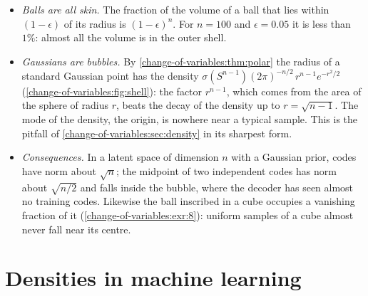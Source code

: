 \begin{notechapter}
\begin{mlthread}
\begin{itemize}[nosep]
  \item \emph{Balls are all skin.} The fraction of the volume of a ball
        that lies within $(1 - \epsilon)$ of its radius is
        $(1 - \epsilon)^n$. For $n = 100$ and $\epsilon = 0.05$ it is
        less than $1\%$: almost all the volume is in the outer shell.
  \item \emph{Gaussians are bubbles.} By
        \cref{change-of-variables:thm:polar} the radius of a standard
        Gaussian point has the density
        $\sigma(S^{n-1})(2\pi)^{-n/2}\,r^{n-1}e^{-r^2/2}$
        (\cref{change-of-variables:fig:shell}): the factor $r^{n-1}$,
        which comes from the area of the sphere of radius $r$, beats
        the decay of the density up to $r = \sqrt{n - 1}$. The mode of
        the density, the origin, is nowhere near a typical sample. This
        is the pitfall of \cref{change-of-variables:sec:density} in its
        sharpest form.
  \item \emph{Consequences.} In a latent space of dimension $n$ with a
        Gaussian prior, codes have norm about $\sqrt n$; the midpoint
        of two independent codes has norm about $\sqrt{n/2}$ and falls
        inside the bubble, where the decoder has seen almost no
        training codes. Likewise the ball inscribed in a cube occupies
        a vanishing fraction of it
        (\cref{change-of-variables:exr:8}): uniform samples of a cube
        almost never fall near its centre.
\end{itemize}
\end{mlthread}

\section{Densities in machine learning}
\label{change-of-variables:sec:ml}


\end{notechapter}
